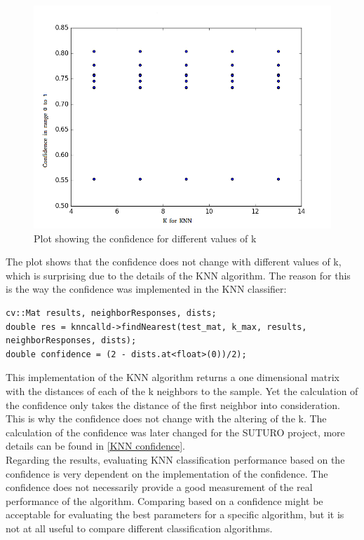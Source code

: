\documentclass[main.tex]{subfiles}
\begin{document}
\begin{figure}
	\includegraphics[width=\textwidth]{pictures/perception/k_comparison.png}
	\caption{Plot showing the confidence for different values of k}
	\label{fig:k comparison plot}
\end{figure}

The plot shows that the confidence does not change with different values of k, which is surprising due to the details of the KNN algorithm. The reason for this is the way the confidence was implemented in the KNN classifier:

\begin{lstlisting}
cv::Mat results, neighborResponses, dists;
double res = knncalld->findNearest(test_mat, k_max, results, neighborResponses, dists);
double confidence = (2 - dists.at<float>(0))/2);
\end{lstlisting}

This implementation of the KNN algorithm returns a one dimensional matrix with the distances of each of the k neighbors to the sample. Yet the calculation of the confidence only takes the distance of the first neighbor into consideration. This is why the confidence does not change with the altering of the k. The calculation of the confidence was later changed for the SUTURO project, more details can be found in \ref{KNN confidence}.\\

Regarding the results, evaluating KNN classification performance based on the confidence is very dependent on the implementation of the confidence. The confidence does not necessarily provide a good measurement of the real performance of the algorithm. Comparing based on a confidence might be acceptable for evaluating the best parameters for a specific algorithm, but it is not at all useful to compare different classification algorithms.\\
\end{document}
